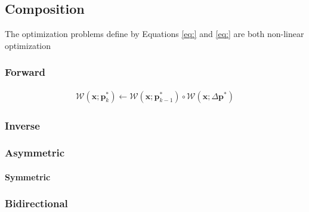 \subsection{Composition}
\label{sec:composition}

The optimization problems define by Equations \ref{eq:} and \ref{eq:} are both non-linear optimization

\subsubsection{Forward}
\label{sec:forward}

\begin{equation}
 	\begin{aligned}
    	\mathcal{W}(\mathbf{x}; \mathbf{p}_k^*) \leftarrow \mathcal{W}(\mathbf{x}; \mathbf{p}_{k-1}^*) \circ \mathcal{W}(\mathbf{x}; \Delta \mathbf{p}^*) 
    \label{eq:fc_update}
    \end{aligned}
\end{equation}


\subsubsection{Inverse}
\label{sec:inverse}

\subsubsection{Asymmetric}
\label{sec:asymmetric}


\paragraph{Symmetric}
\label{sec:symmetric}

\subsubsection{Bidirectional}
\label{sec:bidirectional}
